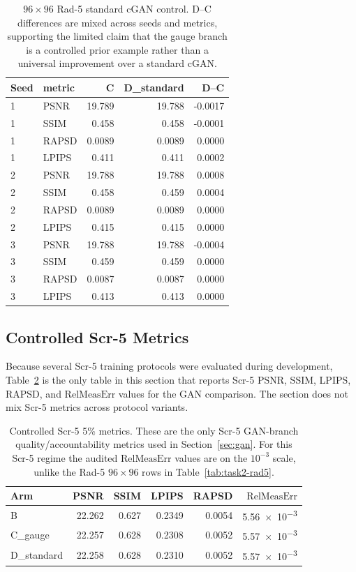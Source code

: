 \documentclass[journal]{IEEEtran}
\newcommand{\RelMeasErr}{\mathrm{RelMeasErr}}
\begin{document}
\begin{table}[!t]
\centering
\caption{$96\times96$ Rad-5 standard cGAN control.  D--C differences are mixed across
seeds and metrics, supporting the limited claim that the gauge branch is a
controlled prior example rather than a universal improvement over a standard
cGAN.}
\label{tab:standard}
\footnotesize
\begin{tabular}{llrrr}
\toprule
Seed & metric & C & D\_standard & D--C\\
\midrule
1 & PSNR & 19.789 & 19.788 & -0.0017\\
1 & SSIM & 0.458 & 0.458 & -0.0001\\
1 & RAPSD & 0.0089 & 0.0089 & 0.0000\\
1 & LPIPS & 0.411 & 0.411 & 0.0002\\
2 & PSNR & 19.788 & 19.788 & 0.0008\\
2 & SSIM & 0.458 & 0.459 & 0.0004\\
2 & RAPSD & 0.0089 & 0.0089 & 0.0000\\
2 & LPIPS & 0.415 & 0.415 & 0.0000\\
3 & PSNR & 19.788 & 19.788 & -0.0004\\
3 & SSIM & 0.459 & 0.459 & 0.0000\\
3 & RAPSD & 0.0087 & 0.0087 & 0.0000\\
3 & LPIPS & 0.413 & 0.413 & 0.0000\\
\bottomrule
\end{tabular}
\end{table}

\subsection{Controlled Scr-5 Metrics}

Because several Scr-5 training protocols were evaluated during development,
Table~\ref{tab:scr5-canonical} is the only table in this section that reports
Scr-5 PSNR, SSIM, LPIPS, RAPSD, and $\RelMeasErr$ values for the GAN comparison.
The section does not mix Scr-5 metrics across protocol variants.

\begin{table}[t]
\centering
\caption{Controlled Scr-5 5\% metrics.  These are the only Scr-5 GAN-branch
quality/accountability metrics used in Section~\ref{sec:gan}.
For this Scr-5 regime the audited $\RelMeasErr$ values are on the $10^{-3}$
scale, unlike the Rad-5 $96\times96$ rows in Table~\ref{tab:task2-rad5}.}
\label{tab:scr5-canonical}
\footnotesize
\begin{tabular}{lrrrr@{\hspace{0.8em}}r}
\toprule
Arm & PSNR & SSIM & LPIPS & RAPSD & $\RelMeasErr$\\
\midrule
B & 22.262 & 0.627 & 0.2349 & 0.0054 & \num{5.56e-3}\\
C\_gauge & 22.257 & 0.628 & 0.2308 & 0.0052 & \num{5.57e-3}\\
D\_standard & 22.258 & 0.628 & 0.2310 & 0.0052 & \num{5.57e-3}\\
\bottomrule
\end{tabular}
\end{table}
\end{document}
